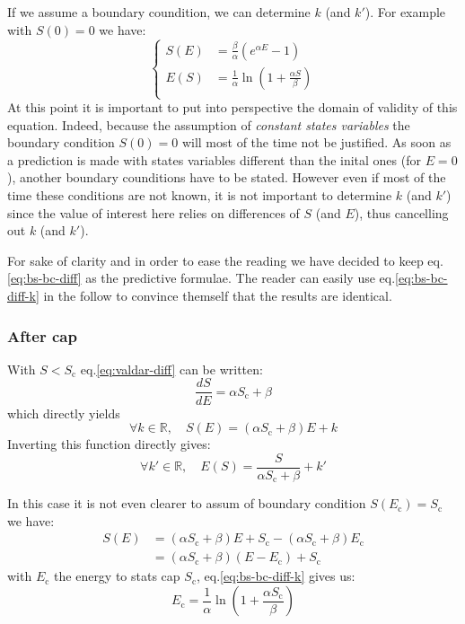\documentclass[12pt]{article}
\def\Sc{S_\text{c}}
\def\Ec{E_\text{c}}
\begin{document}
\par If we assume a boundary coundition, we can determine $k$ (and $k'$).
For example with $S(0)=0$ we have:
\begin{equation}
    \left\{\begin{aligned}
        S(E) &= \frac{\beta}{\alpha}\left(e^{\alpha E} - 1\right) \\
        E(S) &= \frac{1}{\alpha} \ln\left(1+ \frac{\alpha S}{\beta}\right) \\
    \end{aligned}\right.
    \label{eq:bs-bc-diff}
\end{equation}
At this point it is important to put into perspective the domain of validity of this equation.
Indeed, because the assumption of {\it constant states variables} the boundary condition $S(0)=0$ will most of the time not be justified.
As soon as a prediction is made with states variables different than the inital ones (for $E=0$), another boundary counditions have to be stated.
However even if most of the time these conditions are not known, it is not important to determine $k$ (and $k'$) since the value of interest here relies on differences of $S$ (and $E$), thus cancelling out $k$ (and $k'$).

\par For sake of clarity and in order to ease the reading we have decided to keep eq.\eqref{eq:bs-bc-diff} as the predictive formulae.
The reader can easily use eq.\eqref{eq:bs-bc-diff-k} in the follow to convince themself that the results are identical.

\subsubsection{After cap}
With $S<\Sc$ eq.\eqref{eq:valdar-diff} can be written:
\begin{equation}
    \frac{dS}{dE}  = \alpha \Sc + \beta
\end{equation}
which directly yields
\begin{equation}
    \forall k \in \mathbb{R},\quad S(E)  = (\alpha \Sc + \beta) E + k
\end{equation}
Inverting this function directly gives:
\begin{equation}
    \forall k' \in \mathbb{R},\quad E(S)  = \frac{S}{\alpha \Sc + \beta} + k'
    \label{eq:bs-bc-diff-k}
\end{equation}


In this case it is not even clearer to assum of boundary condition $S(\Ec)=\Sc$ we have:
\begin{equation}
    \begin{aligned}
        S(E) & = (\alpha \Sc + \beta)E + \Sc - (\alpha \Sc + \beta) \Ec \\
          & = (\alpha \Sc + \beta) (E - \Ec) + \Sc
    \end{aligned}
\end{equation}
with $\Ec$ the energy to stats cap $\Sc$, eq.\eqref{eq:bs-bc-diff-k} gives us:
\begin{equation}
    \Ec = \frac{1}{\alpha} \ln\left(1+ \frac{\alpha \Sc}{\beta}\right)
\end{equation}
\end{document}
